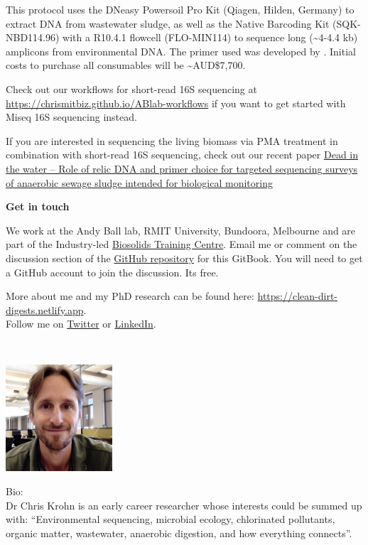 \documentclass[
]{book}
\begin{document}
This protocol uses the DNeasy Powersoil Pro Kit (Qiagen, Hilden, Germany) to extract DNA from wastewater sludge, as well as the Native Barcoding Kit (SQK-NBD114.96) with a R10.4.1 flowcell (FLO-MIN114) to sequence long (\textasciitilde4-4.4 kb) amplicons from environmental DNA. The primer used was developed by \citep{Martijn2019}. Initial costs to purchase all consumables will be \textasciitilde AUD\$7,700.

Check out our workflows for short-read 16S sequencing at \url{https://chrismitbiz.github.io/ABlab-workflows} if you want to get started with Miseq 16S sequencing instead.

If you are interested in sequencing the living biomass via PMA treatment in combination with short-read 16S sequencing, check out our recent paper \href{https://doi.org/10.1016/j.watres.2024.121354}{Dead in the water -- Role of relic DNA and primer choice for targeted sequencing surveys of anaerobic sewage sludge intended for biological monitoring} \citep{Krohn2024}

\textbf{Get in touch}

We work at the Andy Ball lab, RMIT University, Bundoora, Melbourne and are part of the Industry-led \href{https://www.transformingbiosolids.org.au}{Biosolids Training Centre}. Email me or comment on the discussion section of the \href{https://github.com/chrismitbiz/ABlab-workflows/discussions/}{GitHub repository} for this GitBook. You will need to get a GitHub account to join the discussion. Its free.

More about me and my PhD research can be found here: \url{https://clean-dirt-digests.netlify.app}.\\
Follow me on \href{https://twitter.com/CleanDirtChris}{Twitter} or \href{https://www.linkedin.com/in/christian-krohn-54904855}{LinkedIn}.

~

\includegraphics[width=1.5625in,height=\textheight]{./img/avatar.jpg}

Bio:\\
Dr Chris Krohn is an early career researcher whose interests could be summed up with: ``Environmental sequencing, microbial ecology, chlorinated pollutants, organic matter, wastewater, anaerobic digestion, and how everything connects''.
\end{document}

